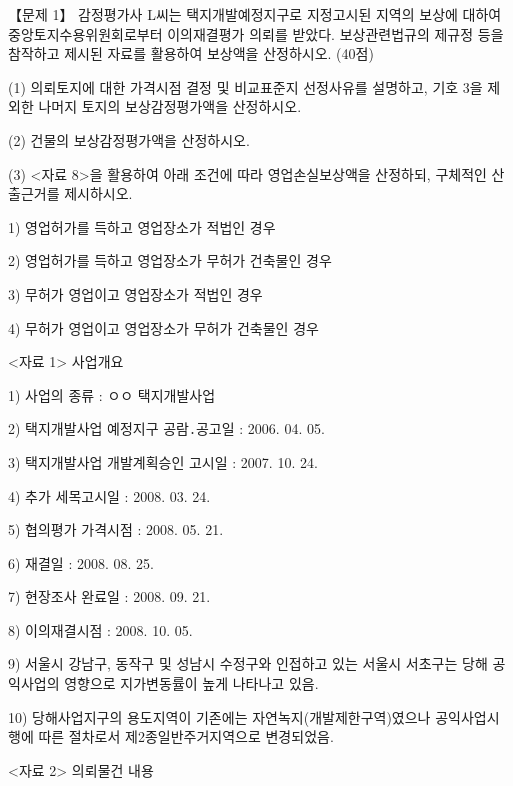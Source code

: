 \begin{longquestion}{【문제 1】}
감정평가사 L씨는 택지개발예정지구로 지정고시된 지역의 보상에 대하여 중앙토지수용위원회로부터 이의재결평가 의뢰를 받았다. 보상관련법규의 제규정 등을 참작하고 제시된 자료를 활용하여 보상액을 산정하시오. (40점) \par
\medskip\noindent (1) 의뢰토지에 대한 가격시점 결정 및 비교표준지 선정사유를 설명하고, 기호 3을 제외한 나머지 토지의 보상감정평가액을 산정하시오. \par
\medskip\noindent (2) 건물의 보상감정평가액을 산정하시오. \par
\medskip\noindent (3) <자료 8>을 활용하여 아래 조건에 따라 영업손실보상액을 산정하되, 구체적인 산출근거를 제시하시오. \par
1) 영업허가를 득하고 영업장소가 적법인 경우 \par
2) 영업허가를 득하고 영업장소가 무허가 건축물인 경우 \par
3) 무허가 영업이고 영업장소가 적법인 경우 \par
4) 무허가 영업이고 영업장소가 무허가 건축물인 경우 \par
<자료 1> 사업개요 \par
1) 사업의 종류 : ㅇㅇ 택지개발사업 \par
2) 택지개발사업 예정지구 공람․공고일 : 2006. 04. 05. \par
3) 택지개발사업 개발계획승인 고시일 : 2007. 10. 24. \par
4) 추가 세목고시일 : 2008. 03. 24. \par
5) 협의평가 가격시점 : 2008. 05. 21. \par
6) 재결일 : 2008. 08. 25. \par
7) 현장조사 완료일 : 2008. 09. 21. \par
8) 이의재결시점 : 2008. 10. 05. \par
9) 서울시 강남구, 동작구 및 성남시 수정구와 인접하고 있는 서울시 서초구는 당해 공익사업의 영향으로 지가변동률이 높게 나타나고 있음. \par
10) 당해사업지구의 용도지역이 기존에는 자연녹지(개발제한구역)였으나 공익사업시행에 따른 절차로서 제2종일반주거지역으로 변경되었음. \par
<자료 2> 의뢰물건 내용 \par

\end{longquestion}
